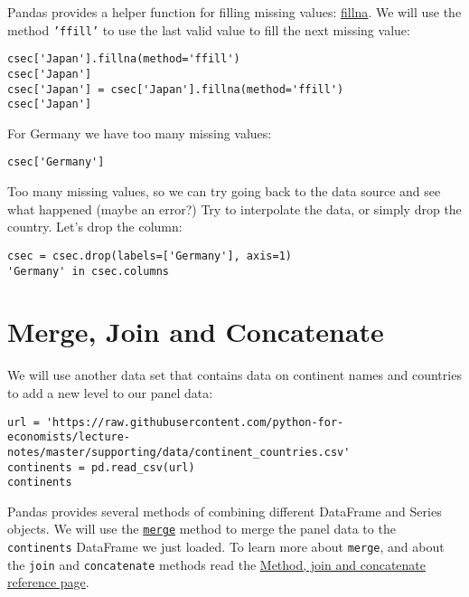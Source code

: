 \documentclass[12pt, a4paper]{article}
\begin{document}
Pandas provides a helper function for filling missing values: \href{https://pandas.pydata.org/pandas-docs/stable/reference/api/pandas.DataFrame.fillna.html?highlight=dataframe.fillna\#pandas.DataFrame.fillna}{fillna}.
We will use the method \texttt{'ffill'} to use the last valid value to fill the next missing value:
\lstset{language=jupyter-python,label= ,caption= ,captionpos=b,numbers=none}
\begin{lstlisting}
csec['Japan'].fillna(method='ffill')
csec['Japan']
csec['Japan'] = csec['Japan'].fillna(method='ffill')
csec['Japan']
\end{lstlisting}

For Germany we have too many missing values:
\lstset{language=jupyter-python,label= ,caption= ,captionpos=b,numbers=none}
\begin{lstlisting}
csec['Germany']
\end{lstlisting}

Too many missing values, so we can try going back to the data source and see what happened (maybe an error?)
Try to interpolate the data, or simply drop the country.
Let's drop the column:
\lstset{language=jupyter-python,label= ,caption= ,captionpos=b,numbers=none}
\begin{lstlisting}
csec = csec.drop(labels=['Germany'], axis=1)
'Germany' in csec.columns
\end{lstlisting}
\section{Merge, Join and Concatenate}
\label{sec:org4ed935b}
We will use another data set that contains data on continent names and countries to add a new level to our panel data:
\lstset{language=jupyter-python,label= ,caption= ,captionpos=b,numbers=none}
\begin{lstlisting}
url = 'https://raw.githubusercontent.com/python-for-economists/lecture-notes/master/supporting/data/continent_countries.csv'
continents = pd.read_csv(url)
continents
\end{lstlisting}

Pandas provides several methods of combining different DataFrame and Series objects.
We will use the \href{https://pandas.pydata.org/pandas-docs/stable/reference/api/pandas.merge.html\#pandas.merge}{\texttt{merge}} method to merge the panel data to the \texttt{continents} DataFrame we just loaded.
To learn more about \texttt{merge}, and about the \texttt{join} and \texttt{concatenate} methods read the \href{https://pandas.pydata.org/pandas-docs/stable/user\_guide/merging.html\#merge-join-and-concatenate}{Method, join and concatenate reference page}.
\end{document}
